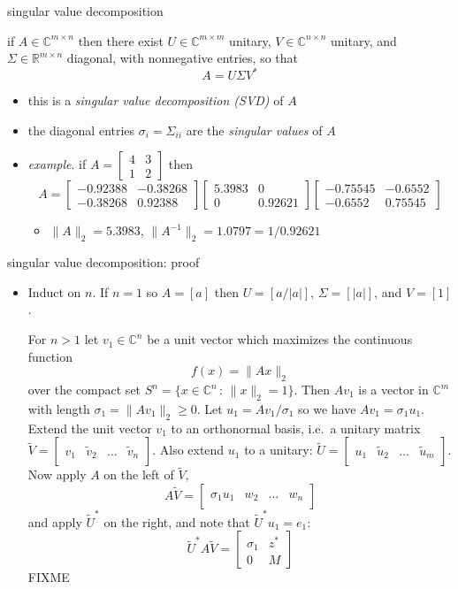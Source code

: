 \documentclass[10pt,hyperref]{beamer}
\newcommand{\CC}{\mathbb{C}}
\newcommand{\RR}{\mathbb{R}}
\newcommand{\ds}{\displaystyle}
\newcommand{\trefmatrixthree}[3]{\left[\begin{array}{c|c|c|c} & & & \\ #1 & #2 & \dots & #3 \\ & & & \end{array}\right]}
\newcommand{\blocktwo}[4]{\left[\begin{array}{c|c} #1 & #2 \\ \hline #3 & #4 \end{array}\right]}
\begin{document}
\begin{frame}{singular value decomposition}

\begin{theorem}
 if $A\in \CC^{m\times n}$ then there exist $U\in \CC^{m\times m}$ unitary, $V \in \CC^{n\times n}$ unitary, and $\Sigma \in \RR^{m\times n}$ diagonal, with nonnegative entries, so that
    $$A = U \Sigma V^*$$
\end{theorem}

\begin{itemize}
\item this is a \emph{singular value decomposition (SVD)} of $A$
\item the diagonal entries $\sigma_i = \Sigma_{ii}$ are the \emph{singular values} of $A$

\medskip
\item \emph{example}. if $\ds A = \begin{bmatrix} 4 & 3 \\ 1 & 2 \end{bmatrix}$ then
    $$A =
\begin{bmatrix}    -0.92388  &  -0.38268 \\  -0.38268   &  0.92388 \end{bmatrix}
\begin{bmatrix}      5.3983  &   0 \\   0 &  0.92621  \end{bmatrix}
\begin{bmatrix}    -0.75545  & -0.6552 \\  -0.6552 & 0.75545 \end{bmatrix}$$
    \begin{itemize}
    \item[$\circ$] $\|A\|_2 = 5.3983$, $\|A^{-1}\|_2 = 1.0797 = 1/0.92621$
    \end{itemize}
\end{itemize}
\end{frame}


\begin{frame}{singular value decomposition: proof}

\begin{itemize}
\footnotesize
\item[\emph{proof.}] Induct on $n$.  If $n=1$ so $A=[a]$ then $U=[a/|a|]$, $\Sigma=[|a|]$, and $V=[1]$.

For $n>1$ let $v_1 \in \CC^n$ be a unit vector which maximizes the continuous function
	$$f(x) = \|A x\|_2$$
over the compact set $S^n = \{x\in\CC^n\,:\,\|x\|_2=1\}$.  Then $Av_1$ is a vector in $\CC^m$ with length $\sigma_1=\|Av_1\|_2\ge 0$.  Let $u_1=Av_1/\sigma_1$ so we have $Av_1=\sigma_1 u_1$.  Extend the unit vector $v_1$ to an orthonormal basis, i.e.~a unitary matrix $\tilde V = \trefmatrixthree{v_1}{\tilde v_2}{\tilde v_n}$.  Also extend $u_1$ to a unitary: $\tilde U = \trefmatrixthree{u_1}{\tilde u_2}{\tilde u_m}$.  Now apply $A$ on the left of $\tilde V$,
    $$A\tilde V = \trefmatrixthree{\sigma_1 u_1}{w_2}{w_n}$$
and apply $\tilde U^*$ on the right, and note that $\tilde U^* u_1 = e_1$:
    $$\tilde U^*A\tilde V = \blocktwo{\sigma_1}{z^*}{0}{M}$$
FIXME
\normalsize
\end{itemize}
\end{frame}
\end{document}
